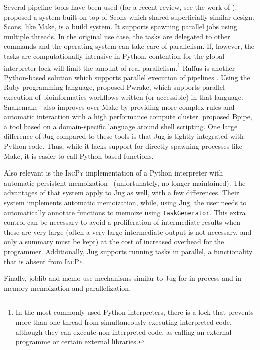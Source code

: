 \documentclass{article}
\begin{document}
Several pipeline tools have been used (for a recent review, see the work of
\citet{leipzig2016a}). \citet{2007reproducible} proposed a system built on
top of Scons which shared superficially similar design. Scons, like Make, is a
build system. It supports spawning parallel jobs using multiple threads. In the
original use case, the tasks are delegated to other commands and the operating
system can take care of parallelism. If, however, the tasks are computationally
intensive in Python, contention for the global interpreter lock will limit the
amount of real parallelism.\footnote{In the most commonly used Python
interpreters, there is a lock that prevents more than one thread from
simultaneously executing interpreted code, although they can execute
non-interpreted code, as calling an external programme or certain external
libraries.} Ruffus is another Python-based solution which supports parallel
execution of pipelines \citep{goodstadt2010ruffus}. Using the Ruby programming
language, \citet{mishima2011} proposed Pwrake, which supports parallel
execution of bioinformatics workflows written (or accessible) in that language.
Snakemake~\citep{kster2012snakemakea} also improves over Make by providing more
complex rules and automatic interaction with a high performance compute
cluster. \citet{sadedin2012bpipe} proposed Bpipe, a tool based on a
domain-specific language around shell scripting. One large difference of Jug
compared to these tools is that Jug is tightly integrated with Python code.
Thus, while it lacks support for directly spawning processes like Make, it is
easier to call Python-based functions.

Also relevant is the \textsc{IncPy} implementation of a Python interpreter with
automatic persistent memoization~\cite{guo2010towards,guo2011using}
(unfortunately, no longer maintained). The advantages of that system apply to
Jug as well, with a few differences. Their system implements automatic
memoization, while, using Jug, the user needs to automatically annotate
functions to memoize using \texttt{TaskGenerator}.  This extra control can be
necessary to avoid a proliferation of intermediate results when these are very
large (often a very large intermediate output is not necessary, and only a
summary must be kept) at the cost of increased overhead for the programmer.
Additionally, Jug supports running tasks in parallel, a functionality that is
absent from \textsc{IncPy}.

Finally, joblib and memo \citep{moreno2016improving} use mechanisms similar to
Jug for in-process and in-memory memoization and parallelization.
\end{document}
